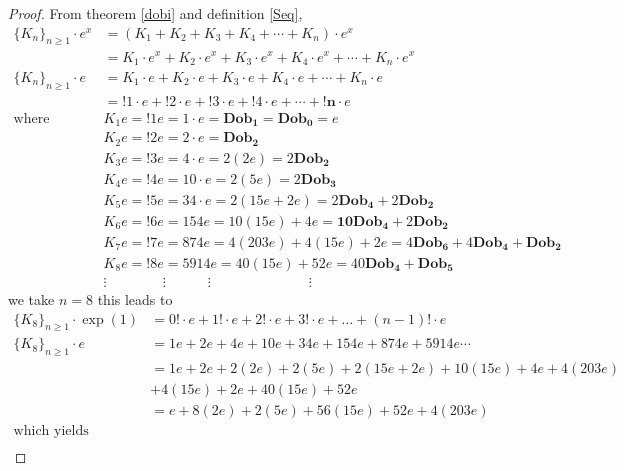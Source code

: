 \documentclass[pdflatex,sn-mathphys-num]{sn-jnl}%
\theoremstyle{thmstyleone}%
\theoremstyle{thmstyletwo}%
\theoremstyle{thmstylethree}%
\begin{document}
\begin{proof}
From theorem \ref{dobi} and definition \ref{Seq},
\begin{align*}
 \lbrace K_n\rbrace_{n\geq 1}\cdotp e^{x}&= (K_1 + K_2 + K_3 +K_4 +\cdots + K_n)\cdotp e^{x}\\
 &=K_1\cdotp e^{x} + K_2 \cdotp e^{x}+ K_3 \cdotp e^{x}+K_4 \cdotp e^{x}+\cdots + K_n \cdotp e^{x}\\ 
 \lbrace K_n\rbrace_{n\geq 1}\cdotp e &=K_1\cdotp e + K_2 \cdotp e + K_3 \cdotp e +K_4 \cdotp e +\cdots + K_n \cdotp e\\ 
&= !1\cdotp e +!2\cdotp e + !3\cdotp e + !4\cdotp e + \cdots + \mathbf{!n}\cdotp e\\ \mbox{where} \quad
& K_1e=!1e = 1\cdotp e = \mathbf{Dob_1}= \mathbf{Dob_0}=e\\
& K_2e=!2e = 2\cdotp e = \mathbf{Dob_2}\\
&K_3e=!3e = 4\cdotp e = 2(2e) =  2\mathbf{Dob_2}\\
&K_4e=!4e = 10 \cdotp e = 2(5e) =  2\mathbf{Dob_3}\\
& K_5e=!5 e = 34 \cdotp e = 2(15e+2e) =  2\mathbf{Dob_4}+ 2\mathbf{Dob_2}\\
&K_6e=!6 e = 154e = 10(15e) + 4e = \mathbf{10 Dob_4} + 2 \mathbf{Dob_2}\\
&K_7e=!7e = 874e = 4(203e) + 4(15e) + 2e = 4 \mathbf{Dob_6} + 4 \mathbf{Dob_4} + \mathbf{Dob_2}\\
& K_8e=!8e = 5914e = 40(15e) + 52e=40 \mathbf{Dob_4} + \mathbf{Dob_5}\\
&\vdots \quad \quad \quad \quad \vdots \quad \quad \quad\vdots \quad \quad \quad \quad \quad \quad \quad\vdots \quad \quad
\end{align*}
we take $n=8$ this leads to
\begin{align*}
 \lbrace K_8\rbrace_{n\geq 1}\cdotp \exp(1) &= 0!\cdotp e +1!\cdotp e + 2!\cdotp e + 3!\cdotp e + \ldots + (n-1)!\cdotp e\\
 \lbrace K_8\rbrace_{n\geq 1}\cdotp e &= 1 e + 2e + 4e + 10e+34e+ 154e+ 874e+ 5914e \cdots\\
 &= 1 e + 2e + 2(2e) + 2(5e) +2(15e+2e)+ 10(15e) + 4e +  4(203e)\\
 &+ 4(15e) + 2e +  40(15e) + 52e\\
&=e +8(2e) + 2(5e)+56(15e)+ 52e + 4(203e) \\ \mbox{which yields} \quad\\

\end{align*}
\end{proof}
\end{document}
